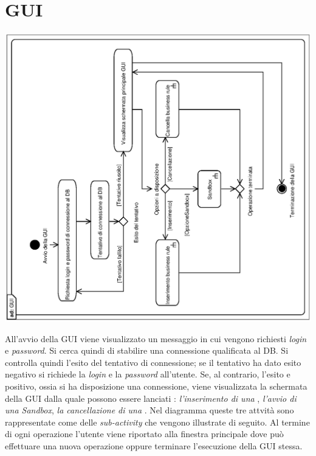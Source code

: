 \documentclass[11pt,titlepage,a4paper]{report}
\begin{document}
\section{GUI}
\begin{center}
 \includegraphics[width=1\textwidth, angle=-90]{GUI.eps}
\end{center}
All'avvio della GUI viene visualizzato un messaggio in cui vengono richiesti \textit{login} e \textit{password}. Si cerca quindi di stabilire una connessione qualificata al DB. 
Si controlla quindi l'esito del tentativo di connessione; se il tentativo ha dato esito negativo si richiede la \textit{login} e la
 \textit{password} all'utente. Se, al contrario, l'esito e positivo, ossia si ha disposizione una connessione, viene visualizzata la schermata della GUI dalla quale
 possono essere lanciati :\textit{ l'inserimento di una \br} , \textit{l'avvio di una Sandbox}, \textit{la cancellazione di una \br} . 
Nel diagramma queste tre attvit\`a sono rappresentate come delle \textit{sub-activity} che vengono illustrate di seguito. Al termine di ogni operazione l'utente viene riportato alla finestra principale dove pu\`o effettuare una nuova operazione oppure terminare l'esecuzione della GUI stessa.
\end{document}
